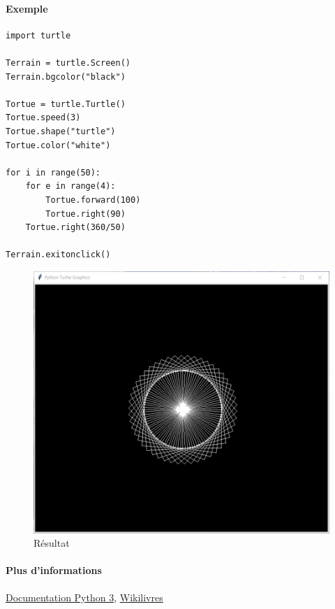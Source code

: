 \documentclass[a4paper, 10pt]{article}
\begin{document}
\paragraph{Exemple}
\begin{verbatim}
import turtle

Terrain = turtle.Screen()
Terrain.bgcolor("black")

Tortue = turtle.Turtle()
Tortue.speed(3)
Tortue.shape("turtle")
Tortue.color("white")

for i in range(50):
    for e in range(4):
        Tortue.forward(100)
        Tortue.right(90)
    Tortue.right(360/50)

Terrain.exitonclick()
\end{verbatim}

\begin{figure}[h]
\begin{center}
\includegraphics[scale=0.5]{turtle.PNG}
\caption*{Résultat}
\end{center}
\end{figure}

\paragraph{Plus d'informations} \href{https://docs.python.org/fr/3.6/library/turtle.html#methods-specific-to-screen-not-inherited-from-turtlescreen}{Documentation Python 3}, \href{https://fr.wikibooks.org/wiki/Programmation_Python/Turtle}{Wikilivres}
\end{document}
